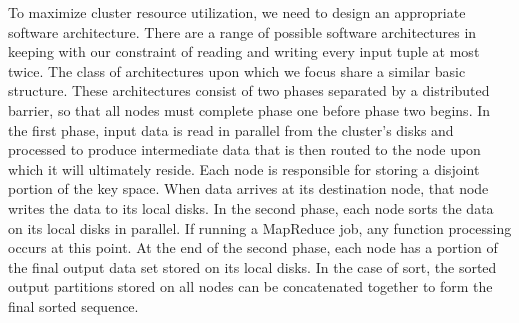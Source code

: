 To maximize cluster resource utilization, we need to design an appropriate
software architecture.  There are a range of possible software architectures in
keeping with our constraint of reading and writing every input tuple at most
twice.  The class of architectures upon which we focus share a similar basic
structure. These architectures consist of two phases separated by a distributed
barrier, so that all nodes must complete phase one before phase two begins.  In
the first phase, input data is read in parallel from the cluster's disks and
processed to produce intermediate data that is then routed to the node upon
which it will ultimately reside.  Each node is responsible for storing a
disjoint portion of the key space.  When data arrives at its destination node,
that node writes the data to its local disks.  In the second phase, each node
sorts the data on its local disks in parallel.  If running a MapReduce job, any
\reduce function processing occurs at this point. At the end of the second
phase, each node has a portion of the final output data set stored on its local
disks. In the case of sort, the sorted output partitions stored on all nodes
can be concatenated together to form the final sorted sequence.

